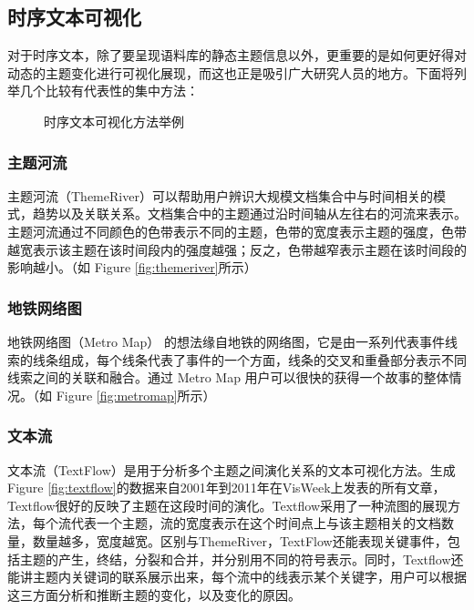 \subsection{时序文本可视化}
对于时序文本，除了要呈现语料库的静态主题信息以外，更重要的是如何更好得对动态的主题变化进行可视化展现，而这也正是吸引广大研究人员的地方。下面将列举几个比较有代表性的集中方法：
\begin{figure}[htb]
	\centering
	\caption{时序文本可视化方法举例}
	\label{fig:temporal-theme-visual}
\end{figure}

\subsubsection{主题河流}
主题河流（ThemeRiver）\cite{Havre:2000}可以帮助用户辨识大规模文档集合中与时间相关的模式，趋势以及关联关系。文档集合中的主题通过沿时间轴从左往右的河流来表示。主题河流通过不同颜色的色带表示不同的主题，色带的宽度表示主题的强度，色带越宽表示该主题在该时间段内的强度越强；反之，色带越窄表示主题在该时间段的影响越小。（如 Figure \ref{fig:themeriver}所示）

\subsubsection{地铁网络图}
地铁网络图（Metro Map）\cite{shahaf2012trains} 的想法缘自地铁的网络图，它是由一系列代表事件线索的线条组成，每个线条代表了事件的一个方面，线条的交叉和重叠部分表示不同线索之间的关联和融合。通过 Metro Map 用户可以很快的获得一个故事的整体情况。（如 Figure \ref{fig:metromap}所示）

\subsubsection{文本流}
文本流（TextFlow）\cite{Weiwei:2011}是用于分析多个主题之间演化关系的文本可视化方法。生成Figure \ref{fig:textflow}的数据来自2001年到2011年在VisWeek上发表的所有文章，Textflow很好的反映了主题在这段时间的演化。Textflow采用了一种流图的展现方法，每个流代表一个主题，流的宽度表示在这个时间点上与该主题相关的文档数量，数量越多，宽度越宽。区别与ThemeRiver，TextFlow还能表现关键事件，包括主题的产生，终结，分裂和合并，并分别用不同的符号表示。同时，Textflow还能讲主题内关键词的联系展示出来，每个流中的线表示某个关键字，用户可以根据这三方面分析和推断主题的变化，以及变化的原因。

